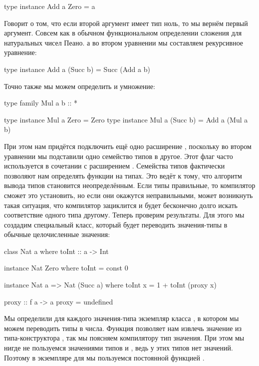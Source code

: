 \begin{code}
type instance Add a Zero        = a
\end{code}

Говорит о том, что если второй аргумент имеет тип ноль, то мы вернём
первый аргумент. Совсем как в обычном функциональном определении
сложения для натуральных чисел Пеано. а во втором уравнении мы
составляем рекурсивное уравнение:


\begin{code}
type instance Add a (Succ b)    = Succ (Add a b)
\end{code}

Точно также мы можем определить и умножение:


\begin{code}
type family Mul a b :: *

type instance Mul a Zero        = Zero
type instance Mul a (Succ b)    = Add a (Mul a b)
\end{code}

При этом нам придётся подключить ещё одно расширение
, поскольку во втором уравнении мы подставили
одно семейство типов в другое. Этот флаг часто используется в сочетании
с расширением . Семейства типов фактически позволяют
нам определять функции на типах. Это ведёт к тому, что алгоритм вывода
типов становится неопределённым. Если типы правильные, то компилятор
сможет это установить, но если они окажутся неправильными, может
возникнуть такая ситуация, что компилятор зациклится и будет бесконечно
долго искать соответствие одного типа другому. Теперь проверим
результаты. Для этого мы создадим специальный класс, который будет
переводить значения-типы в обычные целочисленные значения:


\begin{code}
class Nat a where
    toInt :: a -> Int

instance Nat Zero where
    toInt = const 0

instance Nat a => Nat (Succ a) where
    toInt x = 1 + toInt (proxy x)
        
proxy :: f a -> a
proxy = undefined
\end{code}

Мы определили для каждого значения-типа экземпляр класса , в
котором мы можем переводить типы в числа. Функция  позволяет
нам извлечь значение из типа-конструктора , так мы поясняем
компилятору тип значения. При этом мы нигде не пользуемся значениями
типов  и , ведь у этих типов нет значений. Поэтому в
экземпляре для  мы пользуемся постоянной функцией .


